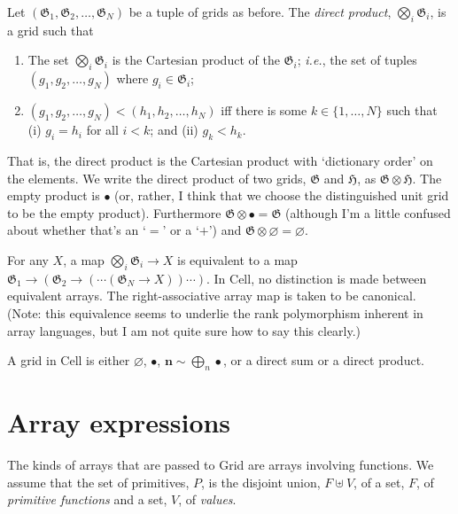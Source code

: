 \documentclass[11pt]{article}
\newcommand{\gr}[1]{\mathfrak{#1}}
\newcommand{\GG}{\gr{G}}
\newcommand{\void}{\varnothing}
\newcommand{\unit}{\bullet}
\begin{document}
Let \((\GG_1, \GG_2, \dots, \GG_N)\) be a tuple of grids as before. The
\emph{direct product}, \(\bigotimes_i \GG_i\), is a grid such that
\begin{enumerate}
\item The set \(\bigotimes_i \GG_i\) is the Cartesian product of the \(\GG_i\);
  \emph{i.e.}, the set of tuples \((g_1, g_2, \dotsc, g_N)\) where
  \(g_i\in\GG_i\);
\item \((g_1, g_2, \dotsc, g_N) < (h_1, h_2, \dotsc, h_N)\) iff there is some
  \(k\in\{1, \dotsc, N\}\) such that (i) \(g_i = h_i\) for all \(i<k\); and (ii)
  \(g_k<h_k\).
\end{enumerate}
That is, the direct product is the Cartesian product with `dictionary order' on
the elements. We write the direct product of two grids, \(\gr{G}\) and
\(\gr{H}\), as \(\gr{G}\otimes\gr{H}\). The empty product is \(\unit\) (or, rather, I
think that we choose the distinguished unit grid to be the empty product).
Furthermore \(\GG\otimes\unit = \GG\) (although I'm a little confused about whether
that's an `$=$' or a `$+$') and \(\GG\otimes\void = \void\).

For any \(X\), a map \(\bigotimes_i\GG_i \to X\) is equivalent to a map \(\GG_1 \to
(\GG_2 \to (\dotsm (\GG_N \to X))\dotsm )\). In Cell, no distinction is made between
equivalent arrays. The right-associative array map is taken to be
canonical. (Note: this equivalence seems to underlie the rank polymorphism
inherent in array languages, but I am not quite sure how to say this clearly.)

A grid in Cell is either \(\void\), \(\unit\), $\mathbf{n}\sim \bigoplus_n \unit$,
or a direct sum or a direct product.



\section{Array expressions}

The kinds of arrays that are passed to Grid are arrays involving functions. We
assume that the set of primitives, $P$, is the disjoint union, $F \uplus V$, of a
set, $F$, of \emph{primitive functions} and a set, $V$, of \emph{values}.
\end{document}
